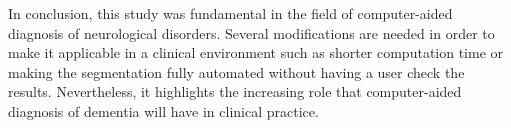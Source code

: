 \documentclass[11pt,a4paper,oneside]{report}
\begin{document}
In conclusion, this study was fundamental in the field of computer-aided diagnosis of neurological disorders. Several modifications are needed in order to make it applicable in a clinical environment such as shorter computation time or making the segmentation fully automated without having a user check the results. Nevertheless, it highlights the increasing role that computer-aided diagnosis of dementia will have in clinical practice.



\nocite{*} %


\end{document}
